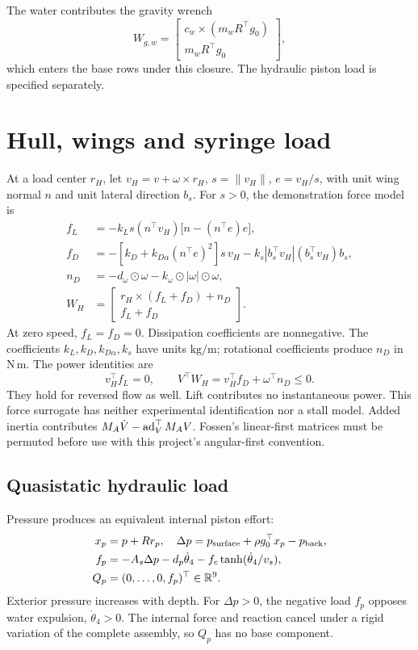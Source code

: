 \documentclass[11pt,a4paper]{article}
\newcommand{\R}{\mathbb R}\newcommand{\SE}{\mathrm{SE}(3)}
\begin{document}
The water contributes the gravity wrench
\begin{equation}
W_{g,w}=\begin{bmatrix}c_w\times(m_wR^\top g_0)\\m_wR^\top g_0\end{bmatrix},
\end{equation}
which enters the base rows under this closure. The hydraulic piston
load is specified separately.
\clearpage

\section{Hull, wings and syringe load}
At a load center \(r_H\), let \(v_H=v+\omega\times r_H\),
\(s=\|v_H\|\), \(e=v_H/s\), with unit wing normal \(n\) and unit lateral
direction \(b_s\). For \(s>0\), the demonstration force model is
\begin{align}
f_L&=-k_Ls(n^\top v_H)\bigl[n-(n^\top e)e\bigr],\\
f_D&=-[k_D+k_{D\alpha}(n^\top e)^2]s\,v_H
-k_s|b_s^\top v_H|(b_s^\top v_H)b_s,\\
n_D&=-d_\omega\odot\omega-k_\omega\odot|\omega|\odot\omega,\\
W_H&=\begin{bmatrix}r_H\times(f_L+f_D)+n_D\\f_L+f_D\end{bmatrix}.\label{eq:hydro}
\end{align}
At zero speed, \(f_L=f_D=0\). Dissipation coefficients are nonnegative.
The coefficients \(k_L,k_D,k_{D\alpha},k_s\) have units
\(\mathrm{kg/m}\); rotational coefficients produce \(n_D\) in
\(\mathrm{N\,m}\). The power identities are
\begin{equation}
v_H^\top f_L=0,\qquad V^\top W_H=v_H^\top f_D+\omega^\top n_D\leq0.
\end{equation}
They hold for reversed flow as well. Lift contributes no instantaneous
power. This force surrogate has neither experimental identification nor
a stall model. Added inertia contributes
\(M_A\dot V-\operatorname{ad}_V^\top M_AV\). Fossen's linear-first matrices must be
permuted before use with this project's angular-first convention.

\subsection{Quasistatic hydraulic load}
Pressure produces an equivalent internal piston effort:
\begin{align}
x_p&=p+Rr_p,\quad
\Delta p=p_{\rm surface}+\rho g_0^\top x_p-p_{\rm back},\\
f_p&=-A_s\Delta p-d_p\dot\theta_4-f_c\tanh(\dot\theta_4/v_s),\\
Q_p&=(0,\ldots,0,f_p)^\top\in\R^9.\label{eq:pump}
\end{align}
Exterior pressure increases with depth. For \(\Delta p>0\), the
negative load \(f_p\) opposes water expulsion, \(\dot\theta_4>0\).
The internal force and reaction cancel under a rigid variation of the
complete assembly, so \(Q_p\) has no base component.
\end{document}
